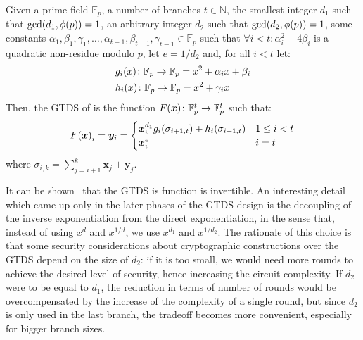 \begin{definition}\label{def:gtds}
  Given a prime field \(\mathbb{F}_p\), a number of branches \(t \in \mathbb{N}\), the smallest 
  integer \(d_1\) such that \(\call{\gcd}{d_1, \call{\totient}{p}} = 1\), an arbitrary 
  integer \(d_2\) such that \(\call{\gcd}{d_2, \call{\totient}{p}} = 1\), some constants 
  \(\alpha_{1}, \beta_{1}, \gamma_1, \dots, \alpha_{t - 1}, \beta_{t - 1}, \gamma_{t - 1} \in \mathbb{F}_p\) 
  such that \(\forall i < t\colon \alpha_i^2 - 4\beta_i\) is a quadratic non-residue modulo 
  \(p\), let \(e = {1}/{d_2}\) and, for all \(i < t\) let:
  \begin{align*}
    & \call{g_i}{x}\colon \mathbb{F}_p \to \mathbb{F}_p = x^2 + \alpha_{i}x + \beta_{i} \\
    & \call{h_i}{x}\colon \mathbb{F}_p \to \mathbb{F}_p = x^2 + \gamma_{i}x
  \end{align*}
  Then, the GTDS of \Arion{} is the function 
  \(\call{F}{\bm{x}}\colon \mathbb{F}_p^t \to \mathbb{F}_p^t\) such that:
  \[
    \call{F}{\bm{x}}_i = \bm{y}_i = 
    \begin{cases}
      \bm{x}_i^{d_1}\call{g_i}{\sigma_{i+1, t}} + \call{h_i}{\sigma_{i+1, t}} & 1 \le i < t \\
      \bm{x}_i^e & i = t
    \end{cases}
  \]
  where \(\sigma_{i, k} = \sum_{j=i+1}^{k}{\bm{x}_j + \bm{y}_j}\).
\end{definition}

It can be shown~\cite{RoyS2022} that the GTDS is function is invertible.
An interesting detail which came up only in the later phases of the GTDS design is the decoupling 
of the inverse exponentiation from the direct exponentiation, in the sense that, instead of 
using \(x^d\) and \(x^{1/d}\), we use \(x^{d_1}\) and \(x^{1/d_2}\).
The rationale of this choice is that some security considerations about cryptographic constructions
over the GTDS depend on the size of \(d_2\): if it is too small, we would need more rounds to 
achieve the desired level of security, hence increasing the circuit complexity.
If \(d_2\) were to be equal to \(d_1\), the reduction in terms of number of rounds would be 
overcompensated by the increase of the complexity of a single round, but since \(d_2\) is only 
used in the last branch, the tradeoff becomes more convenient, especially for bigger branch sizes.

\subsection{\Arion{}}
